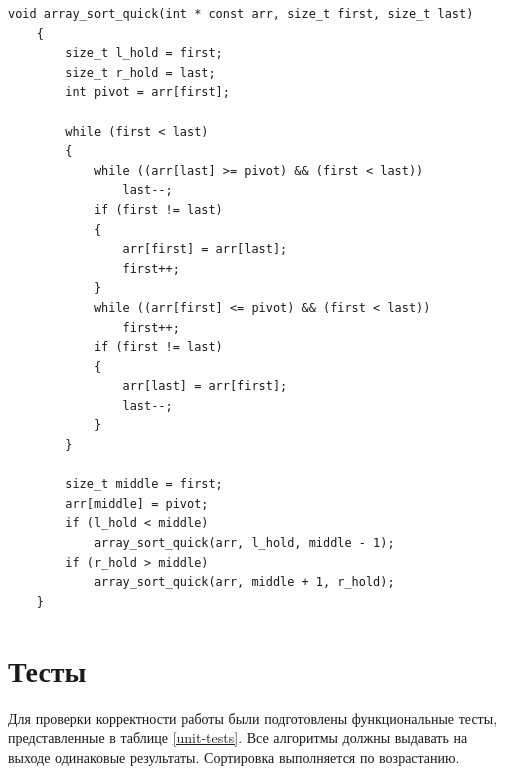 \documentclass[12pt, a4paper]{report}
\begin{document}
	\begin{lstlisting}[label=code-quick,caption=Быстрая сортировка]
	void array_sort_quick(int * const arr, size_t first, size_t last)
	{
		size_t l_hold = first;
		size_t r_hold = last;
		int pivot = arr[first];
		
		while (first < last)
		{
			while ((arr[last] >= pivot) && (first < last))
				last--;
			if (first != last)
			{
				arr[first] = arr[last];
				first++;
			}
			while ((arr[first] <= pivot) && (first < last))
				first++;
			if (first != last)
			{
				arr[last] = arr[first];
				last--;
			}
		}
		
		size_t middle = first;
		arr[middle] = pivot;
		if (l_hold < middle)
			array_sort_quick(arr, l_hold, middle - 1);
		if (r_hold > middle)
			array_sort_quick(arr, middle + 1, r_hold);
	}
	\end{lstlisting}

	\section{Тесты}
	Для проверки корректности работы были подготовлены функциональные тесты, представленные в таблице \ref{unit-tests}. Все алгоритмы должны выдавать на выходе одинаковые результаты. Сортировка выполняется по возрастанию.
\end{document}
